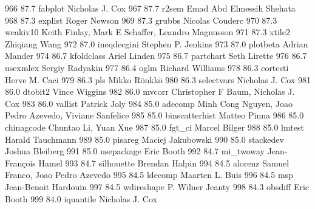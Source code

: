    966     87.7    fabplot       Nicholas J. Cox                         
   967     87.7    r2sem         Emad Abd Elmessih Shehata               
   968     87.3    explist       Roger Newson                            
   969     87.3    grubbs        Nicolas Couderc                         
   970     87.3    weakiv10      Keith Finlay, Mark E Schaffer, Leandro  
                                   Magnusson                               
   971     87.3    xtile2        Zhiqiang Wang                           
   972     87.0    ineqdecgini   Stephen P. Jenkins                      
   973     87.0    plotbeta      Adrian Mander                           
   974     86.7    kfoldclass    Ariel Linden                            
   975     86.7    partchart     Seth Lirette                            
   976     86.7    usexmlex      Sergiy Radyakin                         
   977     86.4    oglm          Richard Williams                        
   978     86.3    cortesti      Herve M. Caci                           
   979     86.3    pls           Mikko Rönkkö                          
   980     86.3    selectvars    Nicholas J. Cox                         
   981     86.0    dtobit2       Vince Wiggins                           
   982     86.0    mvcorr        Christopher F Baum, Nicholas J. Cox     
   983     86.0    vallist       Patrick Joly                            
   984     85.0    adecomp       Minh Cong Nguyen, Joao Pedro Azevedo,   
                                   Viviane Sanfelice                       
   985     85.0    binscatterhist  Matteo Pinna                            
   986     85.0    chinagcode    Chuntao Li, Yuan Xue                    
   987     85.0    fgt_ci        Marcel Bilger                           
   988     85.0    lmtest        Harald Tauchmann                        
   989     85.0    pisareg       Maciej Jakubowski                       
   990     85.0    stackedev     Joshua Bleiberg                         
   991     85.0    usepackage    Eric Booth                              
   992     84.7    mi_twoway     Jean-François Hamel                    
   993     84.7    silhouette    Brendan Halpin                          
   994     84.5    alorenz       Samuel Franco, Joao Pedro Azevedo       
   995     84.5    ldecomp       Maarten L. Buis                         
   996     84.5    msp           Jean-Benoit Hardouin                    
   997     84.5    wdireshape    P. Wilner Jeanty                        
   998     84.3    obsdiff       Eric Booth                              
   999     84.0    iquantile     Nicholas J. Cox                         
